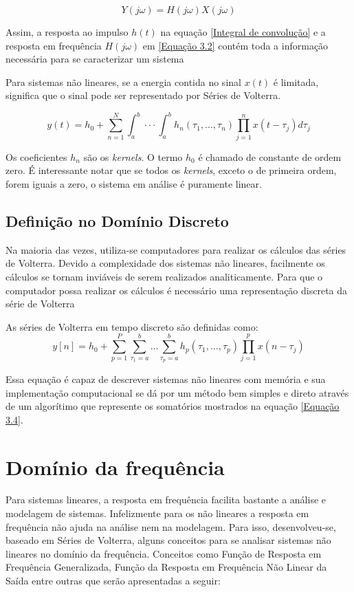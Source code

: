 \begin{equation}
Y(j\omega) = H(j\omega)X(j\omega)
\label{Equação 3.2}
\end{equation}

Assim, a resposta ao impulso $h(t)$ na equação \ref{Integral de convolução} e a resposta em frequência $H(j\omega)$ em \ref{Equação 3.2} contém toda a informação necessária para se caracterizar um sistema \cite{cheng2017volterra}

Para sistemas não lineares, se a energia contida no sinal $x(t)$ é limitada, significa que o sinal pode ser representado por Séries de Volterra.

\begin{equation}
y(t)=h_{0} + \sum_{n=1}^{N} \int_{a}^{b}\cdot\cdot\cdot\int_{a}^{b} h_{n}(\tau_{1},...,\tau_{n})\prod_{j=1}^{n}x(t - \tau_{j})d\tau_{j}
\label{Equação de Volterra}
\end{equation}

Os coeficientes $h_{n}$ são os \textit{kernels}. O termo $h_{0}$ é chamado de constante de ordem zero. É interessante notar que se todos os \textit{kernels}, exceto o de primeira ordem, forem iguais a zero, o sistema em análise é puramente linear.



\subsection*{Definição no Domínio Discreto}
Na maioria das vezes, utiliza-se computadores para realizar os cálculos das séries de Volterra. Devido a complexidade dos sistemas não lineares, facilmente os cálculos se tornam inviáveis de serem realizados analiticamente. Para que o computador possa realizar os cálculos é necessário uma representação discreta da série de Volterra

As séries de Volterra em tempo discreto são definidas como:
\begin{equation}
y[n] = h_{0} + \sum_{p=1}^{P}\sum_{\tau_{1} = a}^{b}\dots\sum_{\tau_{p}= a}^{b} h_{p}(\tau_{1},\dots,\tau_{p}) \prod_{j = 1}^{p} x(n - \tau_{j})
\label{Equação 3.4}
\end{equation}

Essa equação é capaz de descrever sistemas não lineares com memória e sua implementação computacional se dá por um método bem simples e direto através de um algorítimo que represente os somatórios mostrados na equação \ref{Equação 3.4}.


\section*{Domínio da frequência}
Para sistemas lineares, a resposta em frequência facilita bastante a análise e modelagem de sistemas. Infelizmente para os não lineares a resposta em frequência não ajuda na análise nem na modelagem. Para isso, desenvolveu-se, baseado em Séries de Volterra, alguns conceitos para se analisar sistemas não lineares no domínio da frequência. Conceitos como Função de Resposta em Frequência Generalizada, Função da Resposta em Frequência Não Linear da Saída entre outras que serão apresentadas a seguir:
